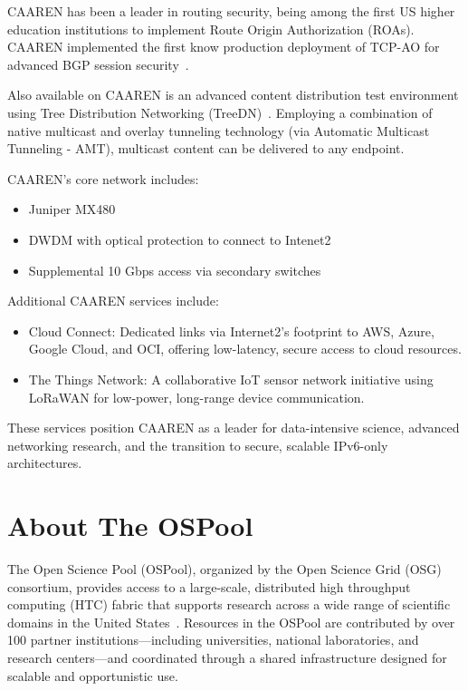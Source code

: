 \documentclass[11pt]{article}
\begin{document}
CAAREN has been a leader in routing security, being among the first US higher education institutions to implement Route Origin Authorization (ROAs).  CAAREN implemented the first know production deployment of TCP-AO for advanced BGP session security~\cite{TCPAO}.
\newline

Also available on CAAREN is an advanced content distribution test environment using Tree Distribution Networking (TreeDN)~\cite{TreeDN}.  Employing a combination of native multicast and overlay tunneling technology (via Automatic Multicast Tunneling - AMT), multicast content can be delivered to any endpoint.
\newline

CAAREN’s core network includes:
\begin{itemize}[leftmargin=*,itemsep=1pt]
 \item Juniper MX480 
\item DWDM with optical protection to connect to Intenet2
 \item Supplemental 10 Gbps access via secondary switches
\end{itemize}

Additional CAAREN services include:
\begin{itemize}[leftmargin=*,label=–,itemsep=1pt]
 \item Cloud Connect: Dedicated links via Internet2’s footprint to AWS, Azure, Google Cloud, and OCI, offering low-latency, secure access to cloud resources.
 \item The Things Network: A collaborative IoT sensor network initiative using LoRaWAN for low-power, long-range device communication.
\end{itemize}

These services position CAAREN as a leader for data-intensive science, advanced networking research, and the transition to secure, scalable IPv6-only architectures.

\section{About The OSPool}
The Open Science Pool (OSPool), organized by the Open Science Grid (OSG) consortium, provides access to a large-scale, distributed high throughput computing (HTC) fabric that supports research across a wide range of scientific domains in the United States~\cite{ospool}. Resources in the OSPool are contributed by over 100 partner institutions—including universities, national laboratories, and research centers—and coordinated through a shared infrastructure designed for scalable and opportunistic use.
\end{document}
